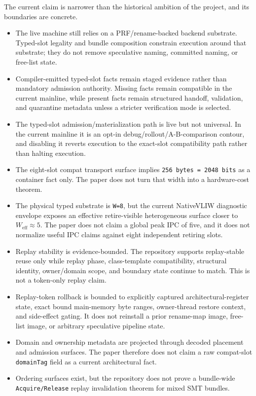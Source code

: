 \documentclass[twocolumn]{article}
\begin{document}
The current claim is narrower than the historical ambition of the project, and its boundaries are concrete.

\begin{itemize}
\item The live machine still relies on a PRF/rename-backed backend substrate. Typed-slot legality and bundle composition constrain execution around that substrate; they do not remove speculative naming, committed naming, or free-list state.
\item Compiler-emitted typed-slot facts remain staged evidence rather than mandatory admission authority. Missing facts remain compatible in the current mainline, while present facts remain structured handoff, validation, and quarantine metadata unless a stricter verification mode is selected.
\item The typed-slot admission/materialization path is live but not universal. In the current mainline it is an opt-in debug/rollout/A-B-comparison contour, and disabling it reverts execution to the exact-slot compatibility path rather than halting execution.
\item The eight-slot compat transport surface implies \texttt{256 bytes = 2048 bits} as a container fact only. The paper does not turn that width into a hardware-cost theorem.
\item The physical typed substrate is \texttt{W=8}, but the current NativeVLIW diagnostic envelope exposes an effective retire-visible heterogeneous surface closer to \(W_{\mathrm{eff}}\approx5\). The paper does not claim a global peak IPC of five, and it does not normalize useful IPC claims against eight independent retiring slots.
\item Replay stability is evidence-bounded. The repository supports replay-stable reuse only while replay phase, class-template compatibility, structural identity, owner/domain scope, and boundary state continue to match. This is not a token-only replay claim.
\item Replay-token rollback is bounded to explicitly captured architectural-register state, exact bound main-memory byte ranges, owner-thread restore context, and side-effect gating. It does not reinstall a prior rename-map image, free-list image, or arbitrary speculative pipeline state.
\item Domain and ownership metadata are projected through decoded placement and admission surfaces. The paper therefore does not claim a raw compat-slot \texttt{domainTag} field as a current architectural fact.
\item Ordering surfaces exist, but the repository does not prove a bundle-wide \texttt{Acquire/Release} replay invalidation theorem for mixed SMT bundles.

\end{itemize}
\end{document}
